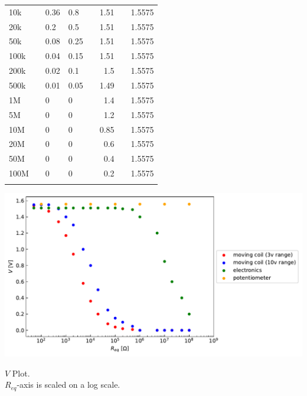 \documentclass[a4paper,10pt]{jsarticle}
\makeatletter
\newenvironment{figurehere}
{\def\@captype{figure}}
{}
\makeatother
\begin{document}
\begin{table}[htbp]
\begin{tabular}{rrrrrrrr}
    \multicolumn{1}{l}{10k} &       & \multicolumn{1}{l}{0.36} & \multicolumn{1}{l}{0.8} &       & 1.51  &       & 1.5575 \\
    \multicolumn{1}{l}{20k} &       & \multicolumn{1}{l}{0.2} & \multicolumn{1}{l}{0.5} &       & 1.51  &       & 1.5575 \\
    \multicolumn{1}{l}{50k} &       & \multicolumn{1}{l}{0.08} & \multicolumn{1}{l}{0.25} &       & 1.51  &       & 1.5575 \\
    \multicolumn{1}{l}{100k} &       & \multicolumn{1}{l}{0.04} & \multicolumn{1}{l}{0.15} &       & 1.51  &       & 1.5575 \\
    \multicolumn{1}{l}{200k} &       & \multicolumn{1}{l}{0.02} & \multicolumn{1}{l}{0.1} &       & 1.5   &       & 1.5575 \\
    \multicolumn{1}{l}{500k} &       & \multicolumn{1}{l}{0.01} & \multicolumn{1}{l}{0.05} &       & 1.49  &       & 1.5575 \\
    \multicolumn{1}{l}{1M} &       & \multicolumn{1}{l}{0} & \multicolumn{1}{l}{0} &       & 1.4   &       & 1.5575 \\
    \multicolumn{1}{l}{5M} &       & \multicolumn{1}{l}{0} & \multicolumn{1}{l}{0} &       & 1.2   &       & 1.5575 \\
    \multicolumn{1}{l}{10M} &       & \multicolumn{1}{l}{0} & \multicolumn{1}{l}{0} &       & 0.85  &       & 1.5575 \\
    \multicolumn{1}{l}{20M} &       & \multicolumn{1}{l}{0} & \multicolumn{1}{l}{0} &       & 0.6   &       & 1.5575 \\
    \multicolumn{1}{l}{50M} &       & \multicolumn{1}{l}{0} & \multicolumn{1}{l}{0} &       & 0.4   &       & 1.5575 \\
    \multicolumn{1}{l}{100M} &       & \multicolumn{1}{l}{0} & \multicolumn{1}{l}{0} &       & 0.2   &       & 1.5575 \\
          &       &       &       &       &       &       &  \\
    \end{tabular}%
  \label{tab:addlabel}%
\end{table}%

\begin{figurehere}
  \centering
  \hspace*{2cm}
  \includegraphics[width=0.75\linewidth]{figs/req_vs_V.pdf}
  \caption{$V$ Plot. \\$R_{eq}$-axis is scaled on a log scale.}
  \label{fig:my_label}
\end{figurehere}
\end{document}

